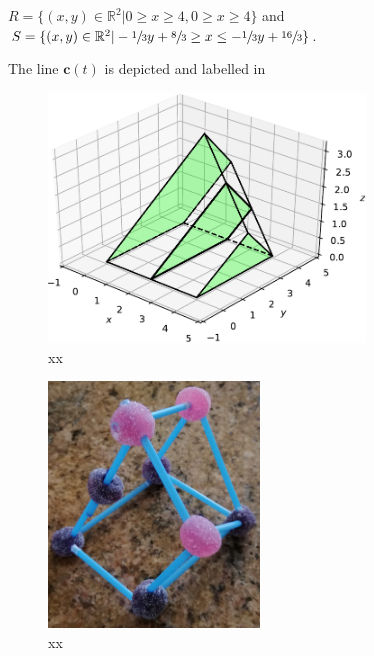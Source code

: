 \documentclass{article}
\theoremstyle{theorem}
\theoremstyle{definition}
\begin{document}

















$R = \{(x,y)\in\mathbb{R}^2|0 \geq x \geq 4, 0 \geq x \geq 4\}$
and $S = \{(x,y)\in\mathbb{R}^2|-\sfrac{1}{3}y+\sfrac{8}{3}\geq x\leq -\sfrac{1}{3}y+\sfrac{16}{3} \}$.



The line $\mathbf{c}(t)$  is depicted and labelled in 


\begin{figure}[htb]
\centering
\includegraphics[width=0.75\textwidth]{prismatoid.pdf}
\caption{xx}
\label{fig:prismatoid}
\end{figure}

\begin{figure}[htb]
\centering
\includegraphics[width=0.5\textwidth]{prismatoid_real.jpg}
\caption{xx}
\label{fig:prismatoid_real}
\end{figure}
\end{document}
